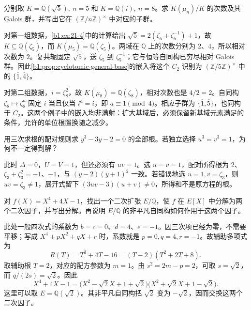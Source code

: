 \begin{exercise}\label{b1:ex:21-5}
	分别取 \(K=\mathbb Q(\sqrt5),\ n=5\) 和 \(K=\mathbb Q(i),\ n=8\)。求 \(K(\mu_n)/K\) 的次数及其 Galois 群，并写出它在 \((\mathbb Z/n\mathbb Z)^\times\) 中对应的子群。
\end{exercise}
\begin{solution}
	对第一组数据，\cref{b1:ex:21-4}中的计算给出 \(\sqrt5=2(\zeta_5+\zeta_5^{-1})+1\)，故 \(K\subseteq\mathbb Q(\zeta_5)\)，而 \(K(\mu_5)=\mathbb Q(\zeta_5)\)。两域在 \(\mathbb Q\) 上的次数分别为 \(2\)、\(4\)，所以相对次数为 \(2\)。复共轭固定 \(\sqrt5\)，送 \(\zeta_5\) 到 \(\zeta_5^{-1}\)；它与恒等自同构已穷尽相对 Galois 群。因此\cref{b1:prop:cyclotomic-general-base}的嵌入将这个 \(C_2\) 识别为 \((\mathbb Z/5\mathbb Z)^\times\) 中的 \(\{\overline1,\overline4\}\)。

	对第二组数据，\(i=\zeta_8^2\)，故 \(K(\mu_8)=\mathbb Q(\zeta_8)\)，相对次数也是 \(4/2=2\)。自同构 \(\zeta_8\mapsto\zeta_8^a\) 固定 \(i\) 当且仅当 \(i^a=i\)，即 \(a\equiv1\pmod4\)。相应子群为 \(\{\overline1,\overline5\}\)，也同构于 \(C_2\)。这两个例子中的嵌入均非满射：扩大基域后，必须保留新基域元素满足的条件，允许的单位根置换随之减少。
\end{solution}

\begin{exercise}\label{b1:ex:21-6}
	用三次求根的配对规则求 \(y^3-3y-2=0\) 的全部根。若独立选择 \(u^3=v^3=1\)，为何不一定得到解？
\end{exercise}
\begin{solution}
	此时 \(\Delta=0\)，\(U=V=1\)，但还必须有 \(uv=1\)。选 \(u=v=1\)，配对所得根为 \(2\)、\(\zeta_3+\zeta_3^2=-1\)、\(-1\)，与 \((y-2)(y+1)^2\) 一致。若错误地选 \(u=1,v=\zeta_3\)，则 \(uv=\zeta_3\neq1\)，展开式留下 \((3uv-3)(u+v)\neq0\)，所得和不是原方程的根。
\end{solution}

\begin{exercise}\label{b1:ex:21-7}
	对 \(f(X)=X^4+4X-1\)，找出一个二次扩张 \(E/\mathbb Q\)，使 \(f\) 在 \(E[X]\) 中分解为两个二次因子，并写出分解。再说明 \(E/\mathbb Q\) 的非平凡自同构如何作用于这两个因子。
\end{exercise}
\begin{solution}
	此处一般四次式的系数为 \(b=c=0\)、\(d=4\)、\(e=-1\)。因三次项已经为零，不需要平移；写成 \(X^4+pX^2+qX+r\) 时，系数就是 \(p=0,q=4,r=-1\)。故辅助多项式为
	\[
		R(T)=T^3+4T-16=(T-2)(T^2+2T+8).
	\]
	取辅助根 \(T=2\)，对应的配方参数为 \(m=1\)。由 \(s^2=2m-p=2\)，可取 \(s=\sqrt2\)，而 \(q/(2s)=\sqrt2\)。因此
	\[
		X^4+4X-1 =\bigl(X^2-\sqrt2X+1+\sqrt2\bigr) \bigl(X^2+\sqrt2X+1-\sqrt2\bigr).
	\]
	这里可以取 \(E=\mathbb Q(\sqrt2)\)。其非平凡自同构把 \(\sqrt2\) 变为 \(-\sqrt2\)，因而交换这两个二次因子。
\end{solution}

